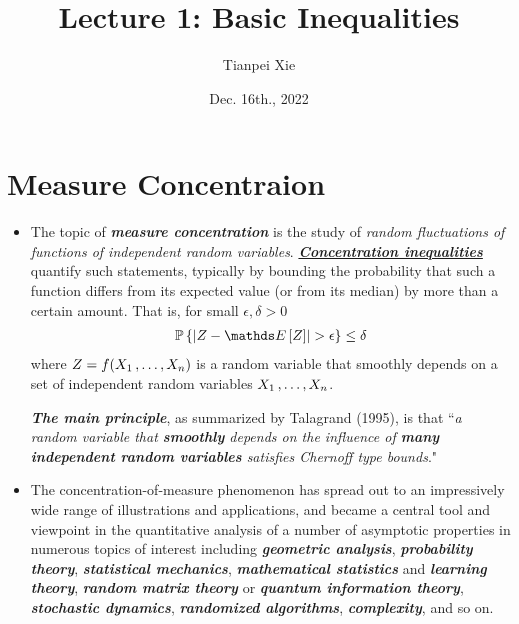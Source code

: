\documentclass[11pt]{article}
\begin{document}
\title{Lecture 1: Basic Inequalities}
\author{ Tianpei Xie}
\date{Dec. 16th., 2022 }
\maketitle
\tableofcontents
\newpage
\section{Measure Concentraion}
\begin{itemize}
\item \begin{remark}
The topic of \emph{\textbf{measure concentration}} is the study of \emph{random fluctuations of functions of independent random variables}. \underline{\emph{\textbf{Concentration inequalities}}} quantify such statements, typically by bounding the probability that such a function differs from its expected value (or from its median) by more than a certain amount. That is, for small $\epsilon, \delta >0$
\begin{align*}
\bP\set{\abs{Z - \E{}{Z}} > \epsilon }\le \delta 
\end{align*} where $Z = f(X_1 \,{,}\ldots{,}\, X_n)$ is a random variable that smoothly depends on a set of independent random variables $X_1 \,{,}\ldots{,}\, X_n$.

\emph{\textbf{The main principle}}, as summarized by Talagrand (1995), is that ``\emph{a random variable that \textbf{smoothly} depends on the influence of \textbf{many independent random variables} satisfies Chernoff type bounds}." 
\end{remark}

\item \begin{remark}
The concentration-of-measure phenomenon has spread out to an impressively wide range of illustrations and applications, and became a central tool and viewpoint in the
quantitative analysis of a number of asymptotic properties in numerous topics of interest including \emph{\textbf{geometric analysis}}, \emph{\textbf{probability theory}}, \emph{\textbf{statistical mechanics}}, \emph{\textbf{mathematical statistics}} and \emph{\textbf{learning theory}}, \emph{\textbf{random matrix theory}} or \emph{\textbf{quantum information theory}}, \emph{\textbf{stochastic dynamics}}, \emph{\textbf{randomized algorithms}}, \emph{\textbf{complexity}}, and so on. \citep{boucheron2013concentration}
\end{remark}
\end{itemize}
\end{document}
